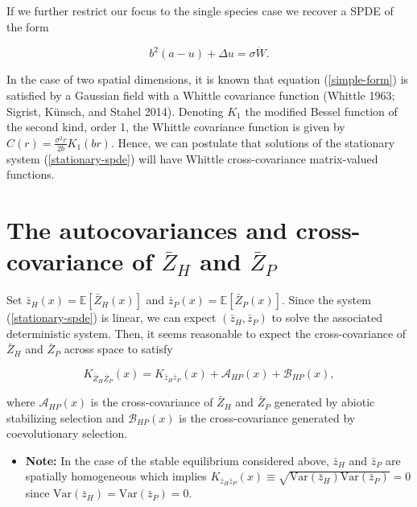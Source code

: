 \documentclass{article}
\begin{document}
If we further restrict our focus to the single species case we recover a
SPDE of the form

\begin{equation}\label{simple-form}
  b^2(a-u)+\Delta u=\sigma\dot W.
\end{equation}

In the case of two spatial dimensions, it is known that equation
(\ref{simple-form}) is satisfied by a Gaussian field with a Whittle
covariance function (Whittle 1963; Sigrist, Künsch, and Stahel 2014).
Denoting \(K_1\) the modified Bessel function of the second kind, order
1, the Whittle covariance function is given by
\(C(r)=\frac{\sigma^2r}{2b}K_1(br)\). Hence, we can postulate that
solutions of the stationary system (\ref{stationary-spde}) will have
Whittle cross-covariance matrix-valued functions.

\hypertarget{the-autocovariances-and-cross-covariance-of-bar-z_h-and-bar-z_p}{%
\section{\texorpdfstring{The autocovariances and cross-covariance of
\(\bar Z_H\) and
\(\bar Z_P\)}{The autocovariances and cross-covariance of \textbackslash bar Z\_H and \textbackslash bar Z\_P}}\label{the-autocovariances-and-cross-covariance-of-bar-z_h-and-bar-z_p}}

Set \(\bar z_H(x)=\mathbb E[\bar Z_H(x)]\) and
\(\bar z_P(x)=\mathbb E[\bar Z_P(x)]\). Since the system
(\ref{stationary-spde}) is linear, we can expect \((\bar z_H,\bar z_P)\)
to solve the associated deterministic system. Then, it seems reasonable
to expect the cross-covariance of \(\bar Z_H\) and \(\bar Z_P\) across
space to satisfy

\begin{equation}
  K_{\bar Z_H\bar Z_P}(x)=K_{\bar z_H\bar z_P}(x)+\mathcal{A}_{HP}(x)+\mathcal B_{HP}(x),
\end{equation}

where \(\mathcal{A}_{HP}(x)\) is the cross-covariance of \(\bar Z_H\)
and \(\bar Z_P\) generated by abiotic stabilizing selection and
\(\mathcal B_{HP}(x)\) is the cross-covariance generated by
coevolutionary selection.

\begin{itemize}
\tightlist
\item
  \textbf{Note:} In the case of the stable equilibrium considered above,
  \(\bar z_H\) and \(\bar z_P\) are spatially homogeneous which implies
  \(K_{\bar z_H\bar z_P}(x)\equiv\sqrt{\mathrm{Var}(\bar z_H)\mathrm{Var}(\bar z_P)}=0\)
  since \(\mathrm{Var}(\bar z_H)=\mathrm{Var}(\bar z_P)=0\).
\end{itemize}
\end{document}
